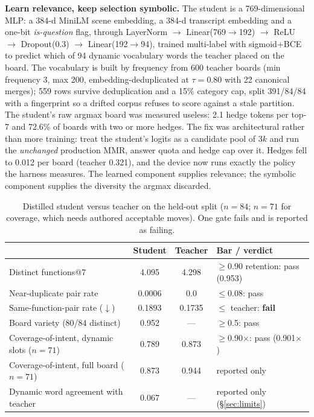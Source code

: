 \textbf{Learn relevance, keep selection symbolic.} The student is a
769-dimensional MLP: a 384-d MiniLM scene embedding, a 384-d transcript
embedding and a one-bit \emph{is-question} flag, through
LayerNorm $\rightarrow$ Linear(769$\rightarrow$192) $\rightarrow$ ReLU
$\rightarrow$ Dropout(0.3) $\rightarrow$ Linear(192$\rightarrow$94), trained
multi-label with sigmoid+BCE to predict which of 94 dynamic vocabulary words the
teacher placed on the board. The vocabulary is built by frequency from 600
teacher boards (min frequency 3, max 200, embedding-deduplicated at $\tau=0.80$
with 22 canonical merges); 559 rows survive deduplication and a 15\% category
cap, split 391/84/84 with a fingerprint so a drifted corpus refuses to score
against a stale partition. The student's raw argmax board was measured useless:
2.1 hedge tokens per top-7 and 72.6\% of boards with two or more hedges. The fix
was architectural rather than more training: treat the student's logits as a
candidate pool of $3k$ and run the \emph{unchanged} production MMR, answer quota
and hedge cap over it. Hedges fell to 0.012 per board (teacher 0.321), and the
device now runs exactly the policy the harness measures. The learned component
supplies relevance; the symbolic component supplies the diversity the argmax
discarded.

\begin{table}[t]
\centering
\small
\caption{Distilled student versus teacher on the held-out split ($n{=}84$;
$n{=}71$ for coverage, which needs authored acceptable moves). One gate fails
and is reported as failing.}
\label{tab:student}
\begin{tabular}{lccl}
\toprule
 & \textbf{Student} & \textbf{Teacher} & \textbf{Bar / verdict} \\
\midrule
Distinct functions@7                  & 4.095  & 4.298  & $\ge$0.90 retention: pass (0.953) \\
Near-duplicate pair rate              & 0.0006 & 0.0    & $\le$0.08: pass \\
Same-function-pair rate ($\downarrow$) & 0.1893 & 0.1735 & $\le$ teacher: \textbf{fail} \\
Board variety (80/84 distinct)        & 0.952  & ---    & $\ge$0.5: pass \\
Coverage-of-intent, dynamic slots ($n{=}71$) & 0.789 & 0.873 & $\ge$0.90$\times$: pass (0.901$\times$) \\
Coverage-of-intent, full board ($n{=}71$)     & 0.873 & 0.944 & reported only \\
Dynamic word agreement with teacher   & 0.067  & ---    & reported only (\S\ref{sec:limits}) \\
\bottomrule
\end{tabular}
\end{table}

